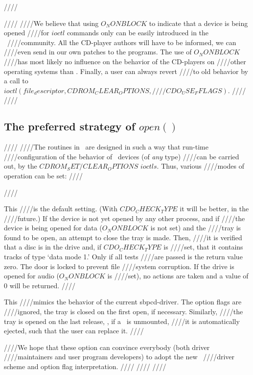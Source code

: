 ////\documentclass{article}
\begin{document}
////
////We believe that using $O_NONBLOCK$ to indicate that a device is being opened
////for $ioctl$ commands only can be easily introduced in the \linux\
////community. All the CD-player authors will have to be informed, we can
////even send in our own patches to the programs. The use of $O_NONBLOCK$
////has most likely no influence on the behavior of the CD-players on
////other operating systems than \linux. Finally, a user can always revert
////to old behavior by a call to $ioctl(file_descriptor, CDROM_CLEAR_OPTIONS,
////CDO_USE_FFLAGS)$. 
////
////\subsection{The preferred strategy of $open()$}
////
////The routines in \cdromc\ are designed in such a way that run-time
////configuration of the behavior of \cdrom\ devices (of {\em any\/} type)
////can be carried out, by the $CDROM_SET/CLEAR_OPTIONS$ $ioctls$. Thus, various
////modes of operation can be set:
////\begin{description}
////\item[$CDO_AUTO_CLOSE \mathrel| CDO_USE_FFLAGS \mathrel| CDO_LOCK$] This
////is the default setting. (With $CDO_CHECK_TYPE$ it will be better, in the
////future.) If the device is not yet opened by any other process, and if
////the device is being opened for data ($O_NONBLOCK$ is not set) and the
////tray is found to be open, an attempt to close the tray is made. Then,
////it is verified that a disc is in the drive and, if $CDO_CHECK_TYPE$ is
////set, that it contains tracks of type `data mode 1.' Only if all tests
////are passed is the return value zero. The door is locked to prevent file
////system corruption. If the drive is opened for audio ($O_NONBLOCK$ is
////set), no actions are taken and a value of 0 will be returned. 
////\item[$CDO_AUTO_CLOSE \mathrel| CDO_AUTO_EJECT \mathrel| CDO_LOCK$] This
////mimics the behavior of the current sbpcd-driver. The option flags are
////ignored, the tray is closed on the first open, if necessary. Similarly,
////the tray is opened on the last release, \ie, if a \cdrom\ is unmounted,
////it is automatically ejected, such that the user can replace it.
////\end{description} 
////We hope that these option can convince everybody (both driver
////maintainers and user program developers) to adopt the new \cdrom\
////driver scheme and option flag interpretation.
////
////
////
\end{document}

